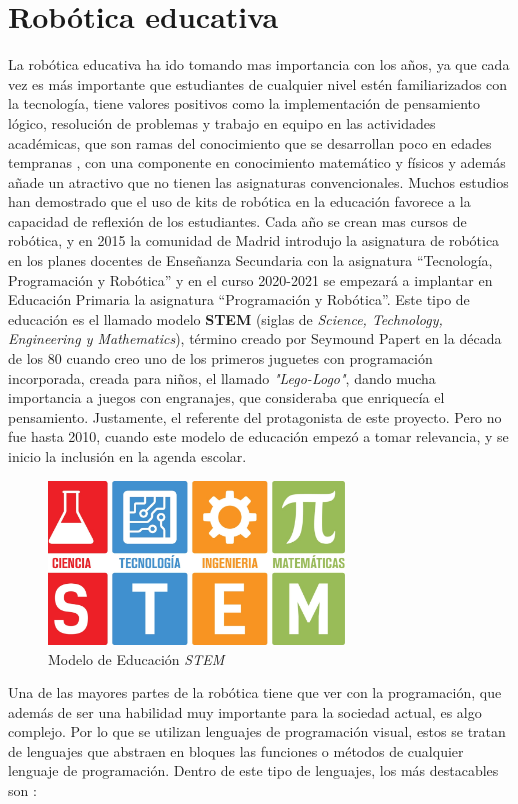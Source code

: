 \section{Robótica educativa}
\label{sec:educativa}
La robótica educativa ha ido tomando mas importancia con los años, ya que cada vez es más importante que estudiantes de cualquier nivel estén familiarizados con la tecnología, tiene valores positivos como la implementación de pensamiento lógico, resolución de problemas y trabajo en equipo en las actividades académicas, que son ramas del conocimiento que se desarrollan poco en edades tempranas , con una componente en conocimiento matemático y físicos y además añade un atractivo que no tienen las asignaturas convencionales.
Muchos estudios han demostrado que el uso de kits de robótica en la educación favorece a la capacidad de reflexión de los estudiantes.
Cada año se crean mas cursos de robótica, y en 2015 la comunidad de Madrid introdujo la asignatura de robótica en los planes docentes de Enseñanza Secundaria con la asignatura ``Tecnología, Programación y Robótica'' y en el curso 2020-2021 se empezará a implantar en Educación Primaria la asignatura ``Programación y Robótica''.\newline
Este tipo de educación es el llamado modelo \textbf{STEM} (siglas de \textit{Science, Technology, Engineering y Mathematics}), término creado por Seymound Papert en la década de los 80 cuando creo uno de los primeros juguetes con programación incorporada, creada para niños, el llamado \textit{"Lego-Logo"}, dando mucha importancia a juegos con engranajes, que consideraba que enriquecía el pensamiento. Justamente, el referente del protagonista de este proyecto.\newline
Pero no fue hasta 2010, cuando este modelo de educación empezó a tomar relevancia, y se inicio la inclusión en la agenda escolar.
        \begin{figure}[H]
    \centering
    \includegraphics[width=0.7\textwidth]{img/stem.jpg}
    \caption{Modelo de Educación \textit{STEM}} \label{fig:stem}
    \end{figure}
Una de las mayores partes de la robótica tiene que ver con la programación, que además de ser una habilidad muy importante para la sociedad actual, es algo complejo. Por lo que se utilizan lenguajes de programación visual, estos se tratan de lenguajes que abstraen en bloques las funciones o métodos de cualquier lenguaje de programación. Dentro de este tipo de lenguajes, los más destacables son :

